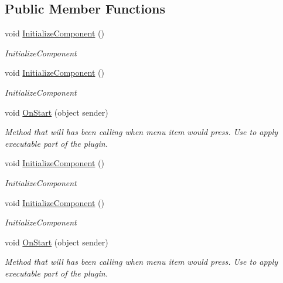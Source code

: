 \subsection*{Public Member Functions}
\begin{DoxyCompactItemize}
\item 
void \mbox{\hyperlink{class_example_plugin1_1_1_sub_plugin1_control_a857e71a9109bd37997043fc579e6ec6e}{Initialize\+Component}} ()
\begin{DoxyCompactList}\small\item\em Initialize\+Component \end{DoxyCompactList}\item 
void \mbox{\hyperlink{class_example_plugin1_1_1_sub_plugin1_control_a857e71a9109bd37997043fc579e6ec6e}{Initialize\+Component}} ()
\begin{DoxyCompactList}\small\item\em Initialize\+Component \end{DoxyCompactList}\item 
void \mbox{\hyperlink{class_example_plugin1_1_1_sub_plugin1_control_aec384d5e0b746afd89495530eb2a679e}{On\+Start}} (object sender)
\begin{DoxyCompactList}\small\item\em Method that will has been calling when menu item would press. Use to apply executable part of the plugin. \end{DoxyCompactList}\item 
void \mbox{\hyperlink{class_example_plugin1_1_1_sub_plugin1_control_a857e71a9109bd37997043fc579e6ec6e}{Initialize\+Component}} ()
\begin{DoxyCompactList}\small\item\em Initialize\+Component \end{DoxyCompactList}\item 
void \mbox{\hyperlink{class_example_plugin1_1_1_sub_plugin1_control_a857e71a9109bd37997043fc579e6ec6e}{Initialize\+Component}} ()
\begin{DoxyCompactList}\small\item\em Initialize\+Component \end{DoxyCompactList}\item 
void \mbox{\hyperlink{class_example_plugin1_1_1_sub_plugin1_control_aec384d5e0b746afd89495530eb2a679e}{On\+Start}} (object sender)
\begin{DoxyCompactList}\small\item\em Method that will has been calling when menu item would press. Use to apply executable part of the plugin. \end{DoxyCompactList}\end{DoxyCompactItemize}
